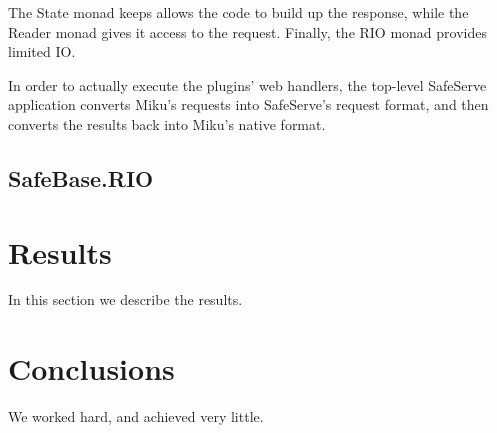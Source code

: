 \documentclass[12pt]{article}
\begin{document}
The State monad keeps allows the code to build up the response, while the Reader monad gives
it access to the request.  Finally, the RIO monad provides limited IO.

In order to actually execute the plugins' web handlers, the top-level SafeServe application
converts Miku's requests into SafeServe's request format, and then converts the results
back into Miku's native format.

\subsection{SafeBase.RIO}





\section{Results}\label{results}
In this section we describe the results.

\section{Conclusions}\label{conclusions}
We worked hard, and achieved very little.



\end{document}
